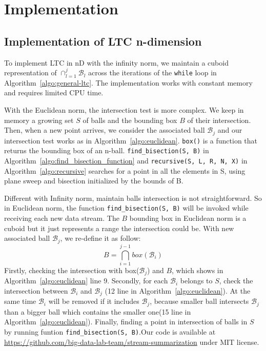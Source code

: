 \chapter{Implementation}
\section{Implementation of LTC n-dimension}
To implement LTC in nD with the infinity norm, we maintain a cuboid
representation of $\cap_{l=1}^j{\mathcal{B}_l}$ across the
iterations of the \texttt{while} loop in
Algorithm~\ref{algo:general-ltc}. The implementation works with
constant memory and requires limited CPU time.

With the Euclidean norm, the intersection test is more complex. We keep in
memory a growing set $S$ of balls and the bounding box $B$ of their
intersection. Then, when a new point arrives, we consider the associated ball
$\mathcal{B}_j$ and our intersection test works as in
Algorithm~\ref{algo:euclidean}. \texttt{box()} is a function that returns the
bounding box of an n-ball. \texttt{find\_bisection(S, B)} in
Algorithm~\ref{algo:find_bisection_function} and \texttt{recursive(S, L, R, N,
X)} in Algorithm~\ref{algo:recursive} searches for a point in all the  elements
in S, using plane sweep and bisection initialized by the bounds of B.


Different with Infinity norm, maintain balls intersection is not
straightforward. So in Euclidean norm, the function  \texttt{find\_bisection(S,
B)} will be invoked while receiving each new data  stream. The $B$ bounding box
in Euclidean norm is a cuboid but it just  represents a range the intersection
could be. With new associated ball  $\mathcal{B}_j$, we re-define it as follow:
\begin{equation*}
    B = \bigcap_{i=1}^{j-1} box(\mathcal{B}_i) 
\end{equation*}
Firstly, checking the intersection with box($\mathcal{B}_j$) and $B$, which
shows in Algorithm~\ref{algo:euclidean} line 9. Secondly, for each
$\mathcal{B}_i$ belongs to $S$, check the intersection between $\mathcal{B}_i$
and $\mathcal{B}_j$ (12 line in Algorithm~\ref{algo:euclidean}). At the same
time $\mathcal{B}_i$ will be removed if it includes $\mathcal{B}_j$, because
smaller ball intersects $\mathcal{B}_j$ than a bigger ball which contains the
smaller one(15 line in Algorithm~\ref{algo:euclidean}). Finally, finding a point
in intersection of balls in $S$ by running funtion \texttt{find\_bisection(S,
B)}.Our code is available at
\url{https://github.com/big-data-lab-team/stream-summarization} under MIT
license.



